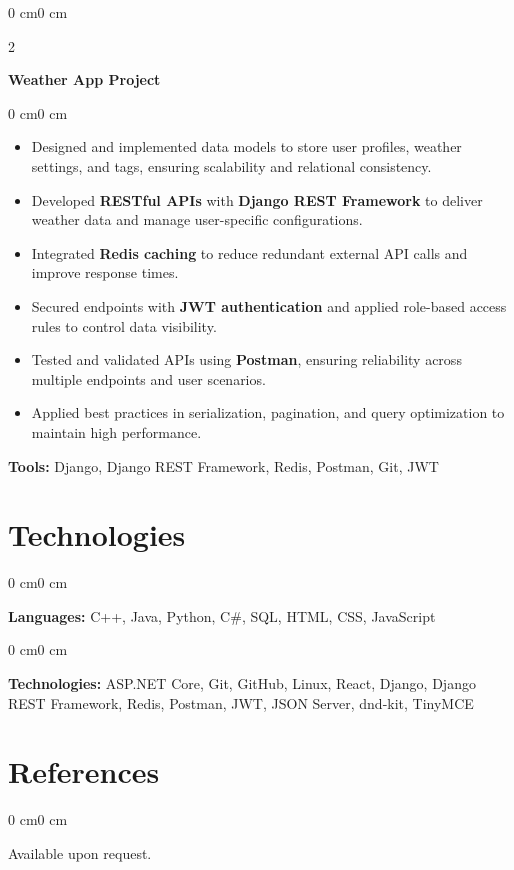 \documentclass[10pt, letterpaper]{article}
\newenvironment{highlights}{
    \begin{itemize}[
        topsep=0.10 cm,
        parsep=0.10 cm,
        partopsep=0pt,
        itemsep=0pt,
        leftmargin=0 cm + 10pt
    ]
}{
    \end{itemize}
}
\newenvironment{onecolentry}{
    \begin{adjustwidth}{0 cm}{0 cm}
}{
    \end{adjustwidth}
}
\newenvironment{twocolentry}[2][]{
    \onecolentry
    \def\secondColumn{#2}
    \setcolumnwidth{\fill, 4.5 cm}
    \begin{paracol}{2}
}{
    \switchcolumn \raggedleft \secondColumn
    \end{paracol}
    \endonecolentry
}
\begin{document}
        \vspace{0.4cm}

        \begin{twocolentry}{}
            \textbf{Weather App Project}
        \end{twocolentry}
        
        \begin{onecolentry}
            \begin{highlights}
                \item Designed and implemented data models to store user profiles, weather settings, and tags, ensuring scalability and relational consistency.
                \item Developed \textbf{RESTful APIs} with \textbf{Django REST Framework} to deliver weather data and manage user-specific configurations.
                \item Integrated \textbf{Redis caching} to reduce redundant external API calls and improve response times.
                \item Secured endpoints with \textbf{JWT authentication} and applied role-based access rules to control data visibility.
                \item Tested and validated APIs using \textbf{Postman}, ensuring reliability across multiple endpoints and user scenarios.
                \item Applied best practices in serialization, pagination, and query optimization to maintain high performance.
            \end{highlights}
            \textbf{Tools:} Django, Django REST Framework, Redis, Postman, Git, JWT
        \end{onecolentry}

    \section{Technologies}        
        \begin{onecolentry}
            \textbf{Languages:} C++, Java, Python, C\#, SQL, HTML, CSS, JavaScript
        \end{onecolentry}

        \vspace{0.2 cm}

        \begin{onecolentry}
            \textbf{Technologies:} ASP.NET Core, Git, GitHub, Linux, React, Django, Django REST Framework, Redis, Postman, JWT, JSON Server, dnd-kit, TinyMCE
        \end{onecolentry}

    \section{References}
        \begin{onecolentry}
            Available upon request.  
        \end{onecolentry}    
\end{document}
